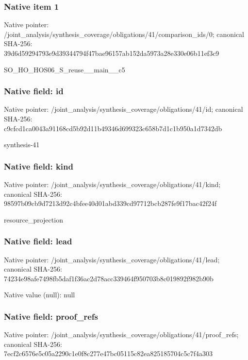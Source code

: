 \documentclass[10pt,a4paper]{article}
\begin{document}
\subsubsection{Native item 1}
Native pointer: /joint\_\allowbreak{}analysis/synthesis\_\allowbreak{}coverage/obligations/41/comparison\_\allowbreak{}ids/0; canonical SHA-256: 39d6d59294793e9d39344794f47bae96157ab152da5973a28e330e06b11ef3c9

\begingroup\raggedright\sloppy SO\_\allowbreak{}HO\_\allowbreak{}HOS06\_\allowbreak{}S\_\allowbreak{}reuse\_\allowbreak{}\_\allowbreak{}main\_\allowbreak{}\_\allowbreak{}c5\par\endgroup

\subsubsection{Native field: id}
Native pointer: /joint\_\allowbreak{}analysis/synthesis\_\allowbreak{}coverage/obligations/41/id; canonical SHA-256: c9cfcd1ca0043a91168cd5b92d11b49346d699323c658b7d1c1b950a1d7342db

\begingroup\raggedright\sloppy synthesis-41\par\endgroup

\subsubsection{Native field: kind}
Native pointer: /joint\_\allowbreak{}analysis/synthesis\_\allowbreak{}coverage/obligations/41/kind; canonical SHA-256: 98597b09cb9d7213d92c4bfee40d01abd339cd97712bcb287fe9f17bac42f24f

\begingroup\raggedright\sloppy resource\_\allowbreak{}projection\par\endgroup

\subsubsection{Native field: lead}
Native pointer: /joint\_\allowbreak{}analysis/synthesis\_\allowbreak{}coverage/obligations/41/lead; canonical SHA-256: 74234e98afe7498fb5daf1f36ac2d78acc339464f950703b8c019892f982b90b

Native value (null): null

\subsubsection{Native field: proof\_\allowbreak{}refs}
Native pointer: /joint\_\allowbreak{}analysis/synthesis\_\allowbreak{}coverage/obligations/41/proof\_\allowbreak{}refs; canonical SHA-256: 7ecf2c6576e5c05a2290c1e0f8c277e47bc05115c82ea825185704c5c7f4a303
\end{document}
